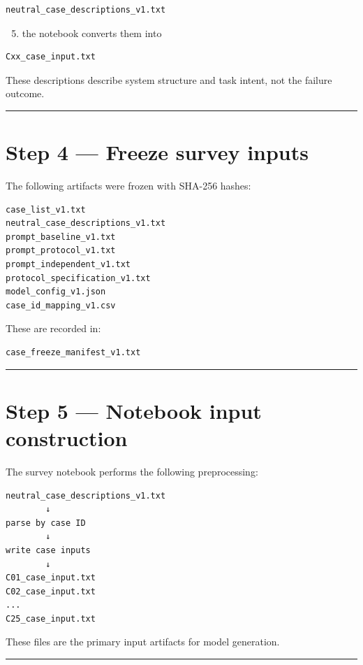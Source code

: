 {\begin{verbatim}
neutral_case_descriptions_v1.txt
\end{verbatim}

\begin{enumerate}
\setcounter{enumi}{4}
\item the notebook converts them into
\end{enumerate}

\begin{verbatim}
Cxx_case_input.txt
\end{verbatim}

These descriptions describe system structure and task intent, not the failure outcome.

\noindent\rule{\textwidth}{0.4pt}

\section*{Step 4 — Freeze survey inputs}

The following artifacts were frozen with SHA-256 hashes:

\begin{verbatim}
case_list_v1.txt
neutral_case_descriptions_v1.txt
prompt_baseline_v1.txt
prompt_protocol_v1.txt
prompt_independent_v1.txt
protocol_specification_v1.txt
model_config_v1.json
case_id_mapping_v1.csv
\end{verbatim}

These are recorded in:

\begin{verbatim}
case_freeze_manifest_v1.txt
\end{verbatim}

\noindent\rule{\textwidth}{0.4pt}

\section*{Step 5 — Notebook input construction}

The survey notebook performs the following preprocessing:

\begin{verbatim}
neutral_case_descriptions_v1.txt
        ↓
parse by case ID
        ↓
write case inputs
        ↓
C01_case_input.txt
C02_case_input.txt
...
C25_case_input.txt
\end{verbatim}

These files are the primary input artifacts for model generation.

\noindent\rule{\textwidth}{0.4pt}

}
